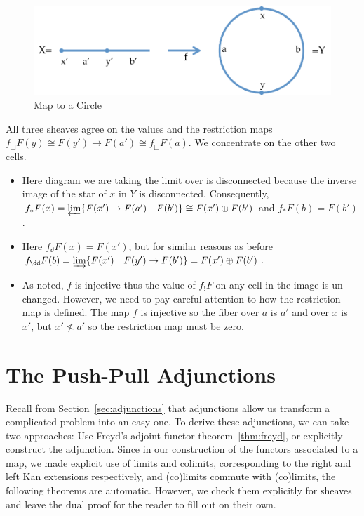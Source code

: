 \begin{figure}[h!]
\centering
\includegraphics[width=\textwidth]{shv_fun_ex3p.pdf}
\caption{Map to a Circle}
\label{fig:shv_fun_ex3}
\end{figure}

All three sheaves agree on the values and the restriction maps $f_{\Box}F(y)\cong F(y')\to F(a')\cong f_{\Box}F(a)$. We concentrate on the other two cells.
\begin{itemize}
 \item Here diagram we are taking the limit over is disconnected because the inverse image of the star of $x$ in $Y$ is disconnected. Consequently, $f_*F(x)=\varprojlim\{F(x')\to F(a') \quad F(b')\}\cong F(x')\oplus F(b')$ and $f_*F(b)=F(b')$.
 \item Here $f_{\dd}F(x)=F(x')$, but for similar reasons as before $f_{\dd}F(b)=\varinjlim\{F(x')\quad F(y')\to F(b')\}=F(x')\oplus F(b')$.
 \item As noted, $f$ is injective thus the value of $f_!F$ on any cell in the image is un-changed. However, we need to pay careful attention to how the restriction map is defined. The map $f$ is injective so the fiber over $a$ is $a'$ and over $x$ is $x'$, but $x'\nleq a'$ so the restriction map must be zero.
\end{itemize}

\section{The Push-Pull Adjunctions}\label{subsec:adjunctions}

Recall from Section~\ref{sec:adjunctions} that adjunctions allow us transform a complicated problem into an easy one. To derive these adjunctions, we can take two approaches: Use Freyd's adjoint functor theorem~\ref{thm:freyd}, or explicitly construct the adjunction. Since in our construction of the functors associated to a map, we made explicit use of limits and colimits, corresponding to the right and left Kan extensions respectively, and (co)limits commute with (co)limits, the following theorems are automatic. However, we check them explicitly for sheaves and leave the dual proof for the reader to fill out on their own.

